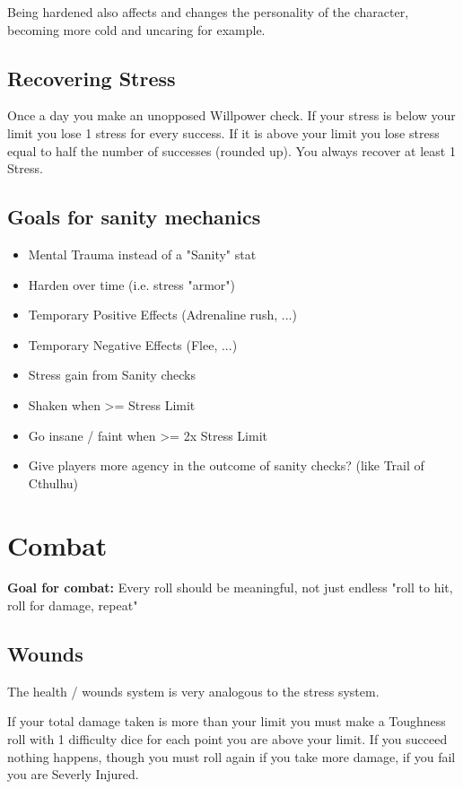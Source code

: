 Being hardened also affects and changes the personality of the character, becoming more cold and uncaring for example.


\section{Recovering Stress}
Once a day you make an unopposed Willpower check. 
If your stress is below your limit you lose 1 stress for every success. 
If it is above your limit you lose stress equal to half the number of successes (rounded up).
You always recover at least 1 Stress.

\section*{Goals for sanity mechanics}
\begin{itemize}
    \item Mental Trauma instead of a "Sanity" stat
    \item Harden over time (i.e. stress "armor")
    \item Temporary Positive Effects (Adrenaline rush, ...)
    \item Temporary Negative Effects (Flee, ...)
    \item Stress gain from Sanity checks
    \item Shaken when >= Stress Limit
    \item Go insane / faint when >= 2x Stress Limit
    \item Give players more agency in the outcome of sanity checks? (like Trail of Cthulhu)
\end{itemize}


\chapter{Combat}

\textbf{Goal for combat:} Every roll should be meaningful, not just endless "roll to hit, roll for damage, repeat" 

\section{Wounds}
The health / wounds system is very analogous to the stress system.

If your total damage taken is more than your limit you must make a Toughness roll with 1 difficulty dice for each point you are above your limit.  
If you succeed nothing happens, though you must roll again if you take more damage, if you fail you are Severly Injured.

